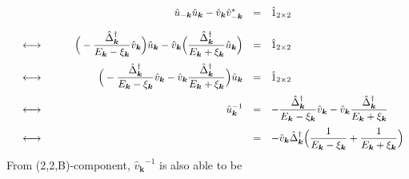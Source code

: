 \documentclass[uplatex,a4j,12pt,dvipdfmx]{jsarticle}
\begin{document}
	\begin{eqnarray}
		\begin{array}{rcrcl}
			 &   &
			\hat{u}_{-\bm{k}} \hat{u}_{\bm{k}} - \hat{v}_{\bm{k}} \hat{v}_{-\bm{k}}^{*}
			 & = &
			\hat{1}_{2 \times 2}
			\nonumber \\[4mm] &\longleftrightarrow& \hspace{8mm}
			\Big( - \dfrac{ \hat{\Delta}^{\dagger}_{\bm{k}} }{ E_{\bm{k}} - \xi_{\bm{k}} } \hat{v}_{\bm{k}} \Big)
			\hat{u}_{\bm{k}}
			-
			\hat{v}_{\bm{k}}
			\Big( \dfrac{ \hat{\Delta}^{\dagger}_{\bm{k}} }{ E_{\bm{k}} + \xi_{\bm{k}} } \hat{u}_{\bm{k}} \Big)
			 & = &
			\hat{1}_{2 \times 2}
			\nonumber \\[4mm] &\longleftrightarrow& \hspace{8mm}
			\Big(
			- \dfrac{ \hat{\Delta}^{\dagger}_{\bm{k}} }{ E_{\bm{k}} - \xi_{\bm{k}} } \hat{v}_{\bm{k}}
			-
			\hat{v}_{\bm{k}}
			\dfrac{ \hat{\Delta}^{\dagger}_{\bm{k}} }{ E_{\bm{k}} + \xi_{\bm{k}} }
			\Big)
			\hat{u}_{\bm{k}}
			 & = &
			\hat{1}_{2 \times 2}
			\nonumber \\[4mm] &\longleftrightarrow& \hspace{8mm}
			{\hat{u}_{\bm{k}}}^{-1}
			 & = &
			- \dfrac{ \hat{\Delta}^{\dagger}_{\bm{k}} }{ E_{\bm{k}} - \xi_{\bm{k}} } \hat{v}_{\bm{k}}
			-
			\hat{v}_{\bm{k}}
			\dfrac{ \hat{\Delta}^{\dagger}_{\bm{k}} }{ E_{\bm{k}} + \xi_{\bm{k}} }
			\nonumber \\[4mm] &\longleftrightarrow& \hspace{8mm}
			 & = &
			- \hat{v}_{\bm{k}} \hat{\Delta}^{\dagger}_{\bm{k}}
			\Big(
			\dfrac{ 1 }{ E_{\bm{k}} - \xi_{\bm{k}} }
			+
			\dfrac{ 1 }{ E_{\bm{k}} + \xi_{\bm{k}} }
			\Big)
		\end{array}
	\end{eqnarray}
	From (2,2,B)-component, ${\hat{v}_{\bm{k}}}^{-1}$ is also able to be
\end{document}
